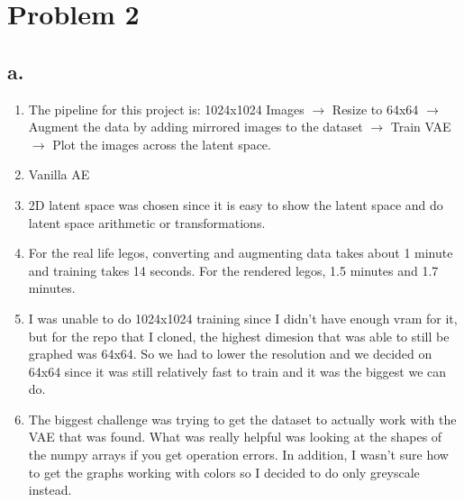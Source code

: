 \documentclass{article}
\begin{document}
\section*{Problem 2}
\subsection*{a.}
\begin{enumerate}
  \item The pipeline for this project is:
        1024x1024 Images $\rightarrow$ Resize to 64x64 $\rightarrow$ Augment the data by adding mirrored
        images to the dataset $\rightarrow$ Train VAE $\rightarrow$ Plot the images across the latent
        space.
  \item Vanilla AE
  \item 2D latent space was chosen since it is easy 
        to show the latent space and
        do latent space arithmetic or transformations.
  \item For the real life legos, converting and augmenting data takes 
        about 1 minute and training takes 14 seconds.
        For the rendered legos, 1.5 minutes and 1.7 minutes.
  \item I was unable to do 1024x1024 training since I didn't have enough vram for it,
        but for the repo that I cloned, the highest dimesion that was able to still
        be graphed was 64x64. So we had to lower the resolution and we decided on
        64x64 since it was still relatively fast to train and it was the biggest
        we can do.
  \item The biggest challenge was trying to get the dataset to actually
        work with the VAE that was found. What was really helpful was
        looking at the shapes of the numpy arrays if you get operation errors.
        In addition, I wasn't sure how to get the graphs working with colors
        so I decided to do only greyscale instead.
\end{enumerate}
\end{document}
